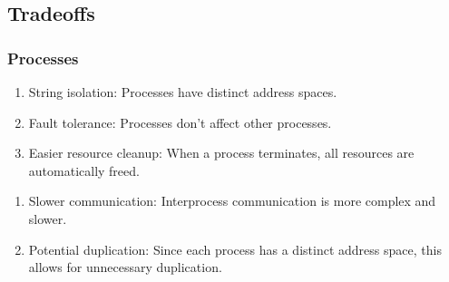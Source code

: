 \documentclass{report}
\begin{document}
\subsection{Tradeoffs}


\subsubsection*{Processes}
\begin{tcbraster}[raster columns=2, raster equal height, raster force size=false]
  \begin{tcolorbox}[colback=green!5!white,colframe=black!75!green,title=Advantages]
    \begin{enumerate}[label=\textit{(\roman*)}]
    \item String isolation: Processes have distinct address spaces.
    \item Fault tolerance: Processes don't affect other processes.
    \item Easier resource cleanup: When a process terminates, all resources are automatically freed.
    \end{enumerate}
  \end{tcolorbox}
  \begin{tcolorbox}[colback=red!5!white,colframe=black!40!red,title=Disadvantages]
    \begin{enumerate}[label=\textit{(\roman*)}]
    \item Slower communication: Interprocess communication is more complex and slower.
    \item Potential duplication: Since each process has a distinct address space, this allows for
      unnecessary duplication.
    \end{enumerate}
  \end{tcolorbox}
\end{tcbraster}
\end{document}
